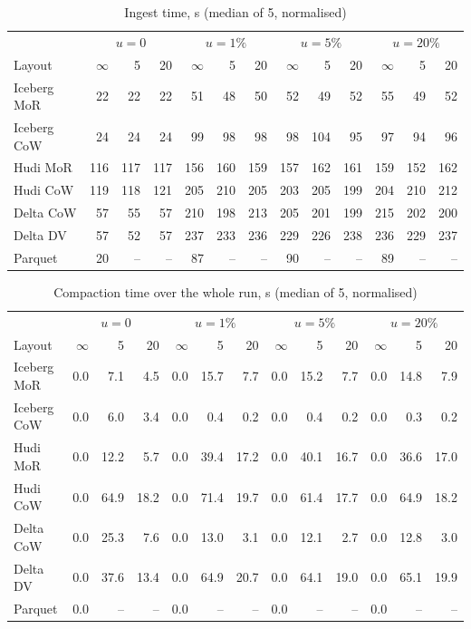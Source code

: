 \documentclass[conference]{IEEEtran}
\begin{document}
\begin{table}[!t]\centering
\caption{Ingest time, s (median of 5, normalised)}\label{tab:a-write}
\footnotesize
\begin{tabular}{@{}lrrrrrrrrrrrr@{}}\toprule
 & \multicolumn{3}{c}{$u=0$} & \multicolumn{3}{c}{$u=1\%$} & \multicolumn{3}{c}{$u=5\%$} & \multicolumn{3}{c}{$u=20\%$}\\
\cmidrule(lr){2-4}\cmidrule(lr){5-7}\cmidrule(lr){8-10}\cmidrule(lr){11-13}
Layout & $\infty$ & 5 & 20 & $\infty$ & 5 & 20 & $\infty$ & 5 & 20 & $\infty$ & 5 & 20\\\midrule
Iceberg MoR & 22 & 22 & 22 & 51 & 48 & 50 & 52 & 49 & 52 & 55 & 49 & 52\\
Iceberg CoW & 24 & 24 & 24 & 99 & 98 & 98 & 98 & 104 & 95 & 97 & 94 & 96\\
Hudi MoR & 116 & 117 & 117 & 156 & 160 & 159 & 157 & 162 & 161 & 159 & 152 & 162\\
Hudi CoW & 119 & 118 & 121 & 205 & 210 & 205 & 203 & 205 & 199 & 204 & 210 & 212\\
Delta CoW & 57 & 55 & 57 & 210 & 198 & 213 & 205 & 201 & 199 & 215 & 202 & 200\\
Delta DV & 57 & 52 & 57 & 237 & 233 & 236 & 229 & 226 & 238 & 236 & 229 & 237\\
Parquet & 20 & -- & -- & 87 & -- & -- & 90 & -- & -- & 89 & -- & --\\\bottomrule
\end{tabular}
\end{table}

\begin{table}[!t]\centering
\caption{Compaction time over the whole run, s (median of 5, normalised)}\label{tab:a-compact}
\footnotesize
\begin{tabular}{@{}lrrrrrrrrrrrr@{}}\toprule
 & \multicolumn{3}{c}{$u=0$} & \multicolumn{3}{c}{$u=1\%$} & \multicolumn{3}{c}{$u=5\%$} & \multicolumn{3}{c}{$u=20\%$}\\
\cmidrule(lr){2-4}\cmidrule(lr){5-7}\cmidrule(lr){8-10}\cmidrule(lr){11-13}
Layout & $\infty$ & 5 & 20 & $\infty$ & 5 & 20 & $\infty$ & 5 & 20 & $\infty$ & 5 & 20\\\midrule
Iceberg MoR & 0.0 & 7.1 & 4.5 & 0.0 & 15.7 & 7.7 & 0.0 & 15.2 & 7.7 & 0.0 & 14.8 & 7.9\\
Iceberg CoW & 0.0 & 6.0 & 3.4 & 0.0 & 0.4 & 0.2 & 0.0 & 0.4 & 0.2 & 0.0 & 0.3 & 0.2\\
Hudi MoR & 0.0 & 12.2 & 5.7 & 0.0 & 39.4 & 17.2 & 0.0 & 40.1 & 16.7 & 0.0 & 36.6 & 17.0\\
Hudi CoW & 0.0 & 64.9 & 18.2 & 0.0 & 71.4 & 19.7 & 0.0 & 61.4 & 17.7 & 0.0 & 64.9 & 18.2\\
Delta CoW & 0.0 & 25.3 & 7.6 & 0.0 & 13.0 & 3.1 & 0.0 & 12.1 & 2.7 & 0.0 & 12.8 & 3.0\\
Delta DV & 0.0 & 37.6 & 13.4 & 0.0 & 64.9 & 20.7 & 0.0 & 64.1 & 19.0 & 0.0 & 65.1 & 19.9\\
Parquet & 0.0 & -- & -- & 0.0 & -- & -- & 0.0 & -- & -- & 0.0 & -- & --\\\bottomrule
\end{tabular}
\end{table}
\end{document}
